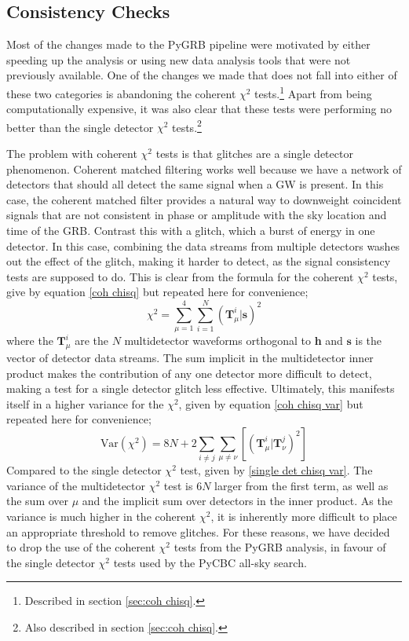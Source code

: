 \documentclass[11pt]{cuthesis}
\begin{document}
\subsection{Consistency Checks} \label{sec:new chisq}
Most of the changes made to the PyGRB pipeline were motivated by either speeding up the analysis or using new data analysis tools that were not previously available. One of the changes we made that does not fall into either of these two categories is abandoning the coherent $\chi^2$ tests.\footnote{Described in section \ref{sec:coh chisq}.} Apart from being computationally expensive, it was also clear that these tests were performing no better than the single detector $\chi^2$ tests.\footnote{Also described in section \ref{sec:coh chisq}.} 

The problem with coherent $\chi^2$ tests is that glitches are a single detector phenomenon. Coherent matched filtering works well because we have a network of detectors that should all detect the same signal when a GW is present. In this case, the coherent matched filter provides a natural way to downweight coincident signals that are not consistent in phase or amplitude with the sky location and time of the GRB. Contrast this with a glitch, which a burst of energy in one detector. In this case, combining the data streams from multiple detectors washes out the effect of the glitch, making it harder to detect, as the signal consistency tests are supposed to do. This is clear from the formula for the coherent $\chi^2$ tests, give by equation \ref{coh chisq} but repeated here for convenience;
\begin{equation}
\chi^2 = \sum_{\mu=1}^4 \sum_{i=1}^N (\textbf{T}^i_\mu | \textbf{s})^2 
\end{equation}
where the $\textbf{T}^i_\mu$ are the $N$ multidetector waveforms orthogonal to \textbf{h} and $\textbf{s}$ is the vector of detector data streams.
The sum implicit in the multidetector inner product makes the contribution of any one detector more difficult to detect, making a test for a single detector glitch less effective. Ultimately, this manifests itself in a higher variance for the $\chi^2$, given by equation \ref{coh chisq var} but repeated here for convenience; 
\begin{equation}
\text{Var}(\chi^2) = 8N + 2\sum_{i \neq j} \sum_{\mu\neq\nu} [(\textbf{T}^i_\mu | \textbf{T}^j_\nu)^2 ] 
\end{equation}
Compared to the single detector $\chi^2$ test, given by \ref{single det chisq var}. The variance of the multidetector $\chi^2$ test is $6N$ larger from the first term, as well as the sum over $\mu$ and the implicit sum over detectors in the inner product. As the variance is much higher in the coherent $\chi^2$, it is inherently more difficult to place an appropriate threshold to remove glitches. For these reasons, we have decided to drop the use of the coherent $\chi^2$ tests from the PyGRB analysis, in favour of the single detector $\chi^2$ tests used by the PyCBC all-sky search.
\end{document}
